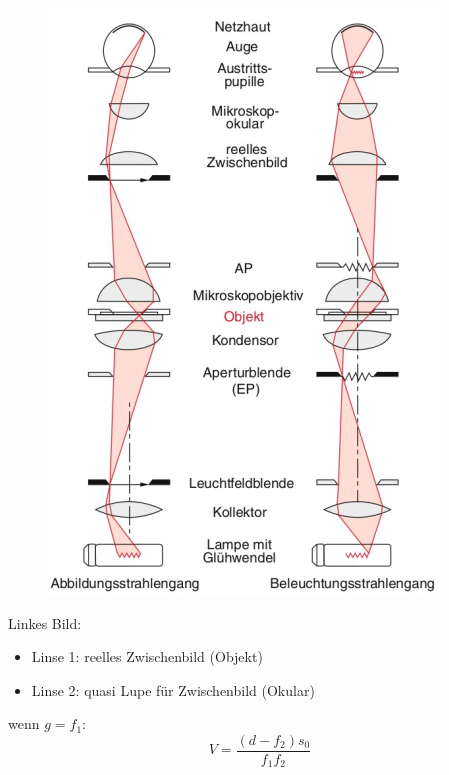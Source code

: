 \documentclass[a4paper, 11pt, ngerman, parskip=half-]{scrartcl}
\begin{document}
\begin{figure}[H]
\begin{minipage}[c]{0.4\textwidth}
        \includegraphics[width=\linewidth]{image/20/6.png}
    \end{minipage}
\end{figure}
Linkes Bild:
\begin{itemize}
    \item Linse 1: reelles Zwischenbild (Objekt)
    \item Linse 2: quasi Lupe für Zwischenbild (Okular)
\end{itemize}
wenn $g = f_1$:
\begin{equation}
    V = \frac{(d- f_2)s_0}{f_1 f_2}
\end{equation}
\end{document}
